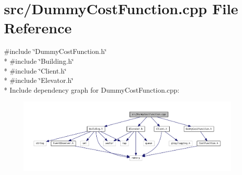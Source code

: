 \section{src/\+Dummy\+Cost\+Function.cpp File Reference}
\label{_dummy_cost_function_8cpp}
{\ttfamily \#include \char`\"{}Dummy\+Cost\+Function.\+h\char`\"{}}\\*
{\ttfamily \#include \char`\"{}Building.\+h\char`\"{}}\\*
{\ttfamily \#include \char`\"{}Client.\+h\char`\"{}}\\*
{\ttfamily \#include \char`\"{}Elevator.\+h\char`\"{}}\\*
Include dependency graph for Dummy\+Cost\+Function.\+cpp\+:
\nopagebreak
\begin{figure}[H]
\begin{center}
\leavevmode
\includegraphics[width=350pt]{_dummy_cost_function_8cpp__incl}
\end{center}
\end{figure}
